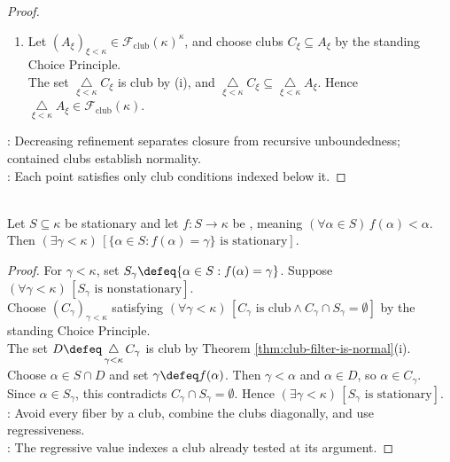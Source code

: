 \begin{theorem}
\begin{proof}
\begin{enumerate}[label=(\roman*)]
\begin{enumerate}[label=(\alph*)]
The strict increase makes $\beta$ a nonzero limit ordinal. Fix $\xi<\beta$ and choose $n<\omega$ with $\xi<\beta_n$.\\
Decreasingness gives $(\forall m\geq n)\,\beta_{m+1}\in C_{\beta_m}\subseteq C_\xi$. This tail is cofinal in $\beta$, so $\beta\in C_\xi$ by closedness.\\
As $\xi<\beta$ was arbitrary, $\beta\in D$; since $\eta<\beta$, the set $D$ is unbounded and therefore club.
\end{enumerate}
\item Let $(A_\xi)_{\xi<\kappa}\in\mathcal{F}_{\mathrm{club}}(\kappa)^\kappa$, and choose clubs $C_\xi\subseteq A_\xi$ by the standing Choice Principle.\\
The set $\mathop{\triangle}\limits_{\xi<\kappa}C_\xi$ is club by (i), and $\mathop{\triangle}\limits_{\xi<\kappa}C_\xi\subseteq\mathop{\triangle}\limits_{\xi<\kappa}A_\xi$. Hence $\mathop{\triangle}\limits_{\xi<\kappa}A_\xi\in\mathcal{F}_{\mathrm{club}}(\kappa)$.
\end{enumerate}
: Decreasing refinement separates closure from recursive unboundedness; contained clubs establish normality.\\
: Each point satisfies only club conditions indexed below it.
\end{proof}
\end{theorem}

\begin{theorem} \label{thm:fodors-pressing-down-lemma} \\
Let $S\subseteq\kappa$ be stationary and let $f:S\to\kappa$ be , meaning $(\forall\alpha\in S)\,f(\alpha)<\alpha$. Then $(\exists\gamma<\kappa)\,[\{\alpha\in S:f(\alpha)=\gamma\}\text{ is stationary}]$.
\begin{proof}
For $\gamma<\kappa$, set $S_\gamma\defeq\{\alpha\in S:f(\alpha)=\gamma\}$. Suppose $(\forall\gamma<\kappa)\,[S_\gamma\text{ is nonstationary}]$.\\
Choose $(C_\gamma)_{\gamma<\kappa}$ satisfying $(\forall\gamma<\kappa)\,[C_\gamma\text{ is club}\land C_\gamma\cap S_\gamma=\emptyset]$ by the standing Choice Principle.\\
The set $D\defeq\mathop{\triangle}\limits_{\gamma<\kappa}C_\gamma$ is club by Theorem \ref{thm:club-filter-is-normal}(i). Choose $\alpha\in S\cap D$ and set $\gamma\defeq f(\alpha)$. Then $\gamma<\alpha$ and $\alpha\in D$, so $\alpha\in C_\gamma$.\\
Since $\alpha\in S_\gamma$, this contradicts $C_\gamma\cap S_\gamma=\emptyset$. Hence $(\exists\gamma<\kappa)\,[S_\gamma\text{ is stationary}]$.\\
: Avoid every fiber by a club, combine the clubs diagonally, and use regressiveness.\\
: The regressive value indexes a club already tested at its argument.
\end{proof}
\end{theorem}

